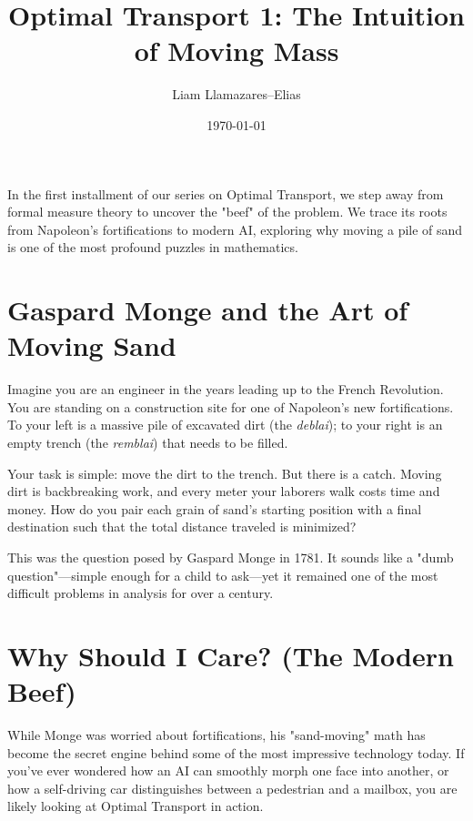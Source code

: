 \documentclass[
	a4paper,
	DIV=13,
	abstract=true,
	numbers=noenddot
]{scrartcl}
\begin{document}
\title{Optimal Transport 1: The Intuition of Moving Mass}
\author{Liam Llamazares--Elias}
\date{\today}
\maketitle

\begin{Abstract}
In the first installment of our series on Optimal Transport, we step away from formal measure theory to uncover the "beef" of the problem. We trace its roots from Napoleon’s fortifications to modern AI, exploring why moving a pile of sand is one of the most profound puzzles in mathematics.
\end{Abstract}

\section{Gaspard Monge and the Art of Moving Sand}
Imagine you are an engineer in the years leading up to the French Revolution. You are standing on a construction site for one of Napoleon's new fortifications. To your left is a massive pile of excavated dirt (the \emph{deblai}); to your right is an empty trench (the \emph{remblai}) that needs to be filled.

Your task is simple: move the dirt to the trench. But there is a catch. Moving dirt is backbreaking work, and every meter your laborers walk costs time and money. How do you pair each grain of sand's starting position with a final destination such that the total distance traveled is minimized?

This was the question posed by Gaspard Monge in 1781. It sounds like a "dumb question"—simple enough for a child to ask—yet it remained one of the most difficult problems in analysis for over a century.

\section{Why Should I Care? (The Modern Beef)}
While Monge was worried about fortifications, his "sand-moving" math has become the secret engine behind some of the most impressive technology today. If you've ever wondered how an AI can smoothly morph one face into another, or how a self-driving car distinguishes between a pedestrian and a mailbox, you are likely looking at Optimal Transport in action.
\end{document}
